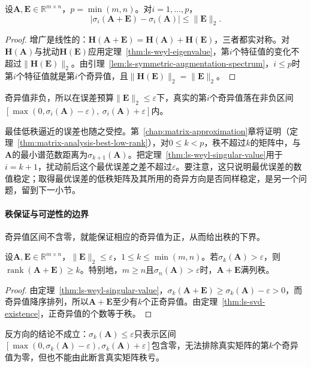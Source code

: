 \begin{theorem}[奇异值的Weyl界]
\label{thm:ls-weyl-singular-value}
设$\bm A,\bm E\in\mathbb R^{m\times n}$，$p=\min(m,n)$。对$i=1,\ldots,p$，
\begin{equation}
 |\sigma_i(\bm A+\bm E)-\sigma_i(\bm A)|\leq\lVert\bm E\rVert_2 .
 \label{eq:matrix-analysis-singular-value-perturbation}
\end{equation}
\end{theorem}
\begin{proof}
增广是线性的：$\bm H(\bm A+\bm E)=\bm H(\bm A)+\bm H(\bm E)$，三者都实对称。对$\bm H(\bm A)$与扰动$\bm H(\bm E)$应用定理~\ref{thm:ls-weyl-eigenvalue}，第$i$个特征值的变化不超过$\lVert\bm H(\bm E)\rVert_2$。由引理~\ref{lem:ls-symmetric-augmentation-spectrum}，$i\leq p$时第$i$个特征值就是第$i$个奇异值，且$\lVert\bm H(\bm E)\rVert_2=\lVert\bm E\rVert_2$。
\end{proof}
奇异值非负，所以在误差预算$\lVert\bm E\rVert_2\leq\varepsilon$下，真实的第$i$个奇异值落在非负区间$[\max(0,\sigma_i(\bm A)-\varepsilon),\ \sigma_i(\bm A)+\varepsilon]$内。

最佳低秩逼近的误差也随之受控。第~\ref{chap:matrix-approximation}章将证明（定理~\ref{thm:matrix-analysis-best-low-rank}），对$0\leq k<p$，秩不超过$k$的矩阵中，与$\bm A$的最小谱范数距离为$\sigma_{k+1}(\bm A)$。把定理~\ref{thm:ls-weyl-singular-value}用于$i=k+1$，扰动前后这个最优误差之差不超过$\varepsilon$。要注意，这只说明最优误差的数值稳定；取得最优误差的低秩矩阵及其所用的奇异方向是否同样稳定，是另一个问题，留到下一小节。

\paragraph{秩保证与可逆性的边界}

奇异值区间不含零，就能保证相应的奇异值为正，从而给出秩的下界。
\begin{theorem}[由奇异值保证秩]
\label{thm:ls-singular-value-rank-guarantee}
设$\bm A,\bm E\in\mathbb R^{m\times n}$，$\lVert\bm E\rVert_2\leq\varepsilon$，$1\leq k\leq\min(m,n)$。若$\sigma_k(\bm A)>\varepsilon$，则$\operatorname{rank}(\bm A+\bm E)\geq k$。特别地，$m\geq n$且$\sigma_n(\bm A)>\varepsilon$时，$\bm A+\bm E$满列秩。
\end{theorem}
\begin{proof}
由定理~\ref{thm:ls-weyl-singular-value}，$\sigma_k(\bm A+\bm E)\geq\sigma_k(\bm A)-\varepsilon>0$，而奇异值降序排列，所以$\bm A+\bm E$至少有$k$个正奇异值。由定理~\ref{thm:ls-svd-existence}，正奇异值的个数等于秩。
\end{proof}
反方向的结论不成立：$\sigma_k(\bm A)\leq\varepsilon$只表示区间$[\max(0,\sigma_k(\bm A)-\varepsilon),\sigma_k(\bm A)+\varepsilon]$包含零，无法排除真实矩阵的第$k$个奇异值为零，但也不能由此断言真实矩阵秩亏。

